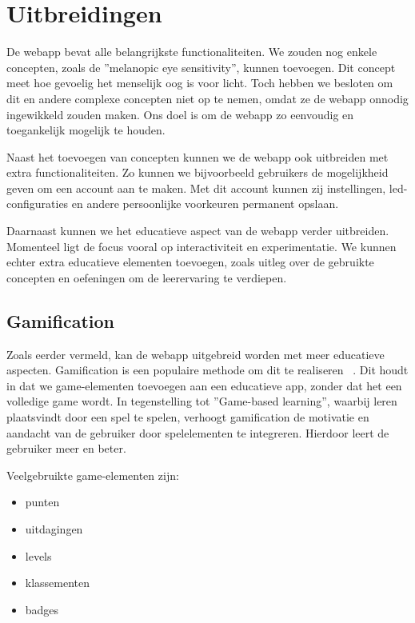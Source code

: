 \chapter{Uitbreidingen}\label{ch:uitbreidingen}

De webapp bevat alle belangrijkste functionaliteiten. We zouden nog enkele concepten, zoals de ''melanopic eye sensitivity'', kunnen toevoegen. Dit concept meet hoe gevoelig het menselijk oog is voor licht. Toch hebben we besloten om dit en andere complexe concepten niet op te nemen, omdat ze de webapp onnodig ingewikkeld zouden maken. Ons doel is om de webapp zo eenvoudig en toegankelijk mogelijk te houden.

Naast het toevoegen van concepten kunnen we de webapp ook uitbreiden met extra functionaliteiten. Zo kunnen we bijvoorbeeld gebruikers de mogelijkheid geven om een account aan te maken. Met dit account kunnen zij instellingen, \gls{led}-configuraties en andere persoonlijke voorkeuren permanent opslaan.

Daarnaast kunnen we het educatieve aspect van de webapp verder uitbreiden. Momenteel ligt de focus vooral op interactiviteit en experimentatie. We kunnen echter extra educatieve elementen toevoegen, zoals uitleg over de gebruikte concepten en oefeningen om de leerervaring te verdiepen.

\section{Gamification}

Zoals eerder vermeld, kan de webapp uitgebreid worden met meer educatieve aspecten. Gamification is een populaire methode om dit te realiseren ~\cite{saleemGamificationApplicationsElearning2022}. Dit houdt in dat we game-elementen toevoegen aan een educatieve app, zonder dat het een volledige game wordt. In tegenstelling tot ''Game-based learning'', waarbij leren plaatsvindt door een spel te spelen, verhoogt gamification de motivatie en aandacht van de gebruiker door spelelementen te integreren. Hierdoor leert de gebruiker meer en beter.

Veelgebruikte game-elementen zijn:
\begin{itemize}
  \item punten
  \item uitdagingen
  \item levels
  \item klassementen
  \item badges
\end{itemize}

